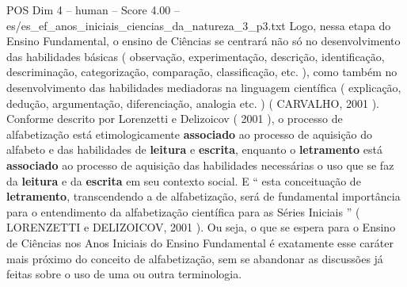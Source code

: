 \begin{textsample}{POS Dim 4 – human – Score 4.00 – es/es\_ef\_anos\_iniciais\_ciencias\_da\_natureza\_3\_p3.txt}  \label{ex:f4_pos_020}
Logo, nessa etapa do Ensino Fundamental, o ensino de Ciências se centrará não só no desenvolvimento das habilidades básicas ( observação, experimentação, descrição, identificação, descriminação, categorização, comparação, classificação, etc. ), como também no desenvolvimento das habilidades mediadoras na linguagem científica ( explicação, dedução, argumentação, diferenciação, analogia etc. ) ( CARVALHO, 2001 ).
Conforme descrito por Lorenzetti e Delizoicov ( 2001 ), o processo de alfabetização está etimologicamente \textbf{associado} ao processo de aquisição do alfabeto e das habilidades de \textbf{leitura} e \textbf{escrita}, enquanto o \textbf{letramento} está \textbf{associado} ao processo de aquisição das habilidades necessárias o uso que se faz da \textbf{leitura} e da \textbf{escrita} em seu contexto social.
E “ esta conceituação de \textbf{letramento}, transcendendo a de alfabetização, será de fundamental importância para o entendimento da alfabetização científica para as Séries Iniciais ” ( LORENZETTI e DELIZOICOV, 2001 ).
Ou seja, o que se espera para o Ensino de Ciências nos Anos Iniciais do Ensino Fundamental é exatamente esse caráter mais próximo do conceito de alfabetização, sem se abandonar as discussões já feitas sobre o uso de uma ou outra terminologia.

\end{textsample}
